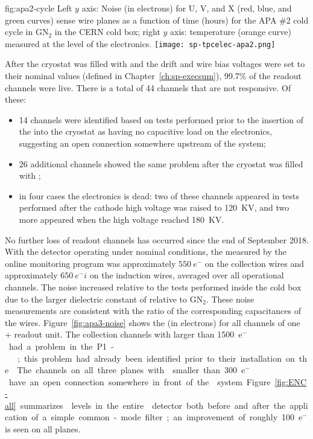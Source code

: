 \begin{dunefigure}
{fig:apa2-cycle}
{Left $y$ axis: Noise (in electrons) for U, V, and X (red, blue, and green 
curves) sense wire planes as a function of time (hours) for the APA \#2 cold 
cycle in GN$_2$ in the CERN cold box; right $y$ axis: temperature 
(orange curve) measured at the level of the  electronics.}
\texttt{[image: sp-tpcelec-apa2.png]}
\end{dunefigure}
After the cryostat was filled with  and the drift and wire 
bias voltages were set to their nominal values (defined in Chapter~\ref{ch:sp-execsum}), 
99.7\% of the  readout channels were live.
There is a total of 44 channels that are not responsive. Of these:
\begin{itemize}
\item{14 channels were identified based on tests performed prior
to the insertion of the  into the cryostat as having
no capacitive load on the  electronics, suggesting an open 
connection somewhere upstream  of the  system;}
\item{26 additional channels showed the same problem after the
cryostat was filled with ;}
\item{in four cases the  electronics is dead: two of these
channels appeared in tests performed after the cathode high
voltage was raised to \SI{120}{KV}, and two more
appeared when the high voltage reached \SI{180}{KV}.}
\end{itemize}

No further loss of readout channels has occurred since 
the end of September 2018.
With the detector operating under nominal %
conditions, the 
measured by the online monitoring program was approximately $\SI{550}{e^-}$ 
on the collection wires and approximately $\SI{650}{e^-i}$ on the induction
wires, averaged over all operational channels. The noise increased %
relative to the tests performed inside the cold box due to the 
larger dielectric constant of \lntwo 
{} relative to GN$_2$. 
These noise measurements  %
are consistent with the 
ratio of the corresponding capacitances of the  wires. 
Figure~\ref{fig:apa3-noise} 
shows the  (in electrons) for all channels of one %
+ readout unit. %
The collection channels with  larger than \SI{1500}{e$^-$} had a problem %
 in the P1- 
;  %
this problem had already
been identified %
prior to their
installation on the . The channels on all three planes 
with  smaller than \SI{300}{e$^-$} have an open connection somewhere in 
front of the  system. Figure~\ref{fig:ENC-all} summarizes
 levels in the entire  detector both before and
after the application of a simple common-mode filter; an improvement
of roughly 100~e$^-$ is seen on all planes. %

